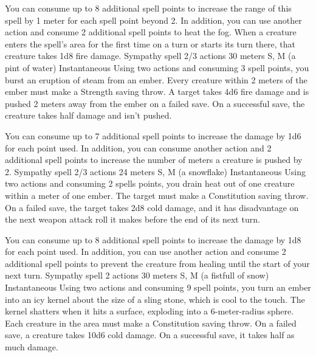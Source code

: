        You can consume up to 8 additional spell points to increase the range of this spell by 1 meter for each spell point beyond 2.
        In addition, you can use another action and consume 2 additional spell points to heat the fog.
        When a creature enters the spell's area for the first time on a turn or starts its turn there, that creature takes 1d8 fire damage.
        {Sympathy spell}
        {2/3 actions}
        {30 meters}
        {S, M (a pint of water)}
        {Instantaneous}
        Using two actions and consuming 3 spell points, you burst an eruption of steam from an ember.
        Every creature within 2 meters of the ember must make a Strength saving throw.
        A target takes 4d6 fire damage and is pushed 2 meters away from the ember on a failed save.
        On a successful save, the creature takes half damage and isn't pushed.

        You can consume up to 7 additional spell points to increase the damage by 1d6 for each point used.
        In addition, you can consume another action and 2 additional spell points to increase the number of meters a creature is pushed by 2.
        {Sympathy spell}
        {2/3 actions}
        {24 meters}
        {S, M (a snowflake)}
        {Instantaneous}
        Using two actions and consuming 2 spells points, you drain heat out of one creature within a meter of one ember.
        The target must make a Constitution saving throw.
        On a failed save, the target takes 2d8 cold damage, and it has disadvantage on the next weapon attack roll it makes before the end of its next turn.

        You can consume up to 8 additional spell points to increase the damage by 1d8 for each point used.
        In addition, you can use another action and consume 2 additional spell points to prevent the creature from healing until the start of your next turn.
        {Sympathy spell}
        {2 actions}
        {30 meters}
        {S, M (a fistfull of snow)}
        {Instantaneous}
        Using two actions and consuming 9 spell points, you turn an ember into an icy kernel about the size of a sling stone, which is cool to the touch.
        The kernel shatters when it hits a surface, exploding into a 6-meter-radius sphere.
        Each creature in the area must make a Constitution saving throw.
        On a failed save, a creature takes 10d6 cold damage.
        On a successful save, it takes half as much damage.

